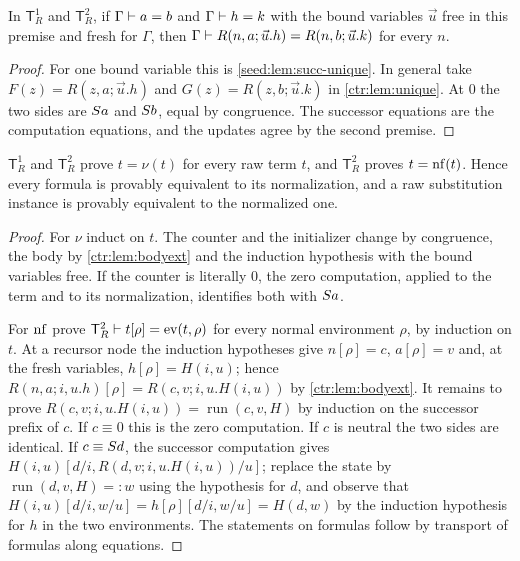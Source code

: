 \begin{lemma}\label{ctr:lem:bodyext}
In $\mathsf T_R^1$ and $\mathsf T_R^2$, if $\Gamma\vdash a=b$ and $\Gamma\vdash h=k$ with
the bound variables $\vec u$ free in this premise and fresh for $\Gamma$, then
$\Gamma\vdash R(n,a;\vec u.h)=R(n,b;\vec u.k)$ for every $n$.
\end{lemma}
\begin{proof}
For one bound variable this is \cref{seed:lem:succ-unique}. In general take
$F(z)=R(z,a;\vec u.h)$ and $G(z)=R(z,b;\vec u.k)$ in \cref{ctr:lem:unique}. At $0$ the
two sides are $S a$ and $S b$, equal by congruence. The successor equations are the
computation equations, and the updates agree by the second premise.
\end{proof}

\begin{lemma}\label{ctr:lem:normsound}
$\mathsf T_R^1$ and $\mathsf T_R^2$ prove $t=\nu(t)$ for every raw term $t$, and
$\mathsf T_R^2$ proves $t=\operatorname{nf}(t)$. Hence every formula is provably equivalent to its
normalization, and a raw substitution instance is provably equivalent to the normalized one.
\end{lemma}
\begin{proof}
For $\nu$ induct on $t$. The counter and the initializer change by congruence, the body by
\cref{ctr:lem:bodyext} and the induction hypothesis with the bound variables free. If the
counter is literally $0$, the zero computation, applied to the term and to its
normalization, identifies both with $S a$.

For $\operatorname{nf}$ prove $\mathsf T_R^2\vdash t[\rho]=\operatorname{ev}(t,\rho)$ for every normal
environment $\rho$, by induction on $t$. At a recursor node the induction hypotheses give
$n[\rho]=c$, $a[\rho]=v$ and, at the fresh variables, $h[\rho]=H(i,u)$; hence
$R(n,a;i,u.h)[\rho]=R(c,v;i,u.H(i,u))$ by \cref{ctr:lem:bodyext}. It remains to prove
$R(c,v;i,u.H(i,u))=\operatorname{run}(c,v,H)$ by induction on the successor prefix of $c$.
If $c\equiv 0$ this is the zero computation. If $c$ is neutral the two sides are identical.
If $c\equiv S d$, the successor computation gives
$H(i,u)[d/i,R(d,v;i,u.H(i,u))/u]$; replace the state by $\operatorname{run}(d,v,H)=:w$ using
the hypothesis for $d$, and observe that $H(i,u)[d/i,w/u]=h[\rho][d/i,w/u]=H(d,w)$ by the
induction hypothesis for $h$ in the two environments. The statements on formulas follow by
transport of formulas along equations.
\end{proof}

